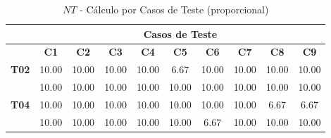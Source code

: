 \begin{table}[htbp]
	\centering
	\caption{$NT$ - Cálculo por Casos de Teste (proporcional)}
	\begin{tabular}{c|ccccccccc|}
		\cline{2-10}
		\rowcolor[HTML]{D0CECE} 
		\cellcolor[HTML]{F2F2F2}\textbf{} & \multicolumn{9}{c|}{\cellcolor[HTML]{D0CECE}\textbf{Casos de Teste}} \\ \hline
		\rowcolor[HTML]{D9D9D9} 
		\multicolumn{1}{|c|}{\cellcolor[HTML]{D0CECE}\textbf{Participante}} & \multicolumn{1}{c|}{\cellcolor[HTML]{D9D9D9}\textbf{C1}} & \multicolumn{1}{c|}{\cellcolor[HTML]{D9D9D9}\textbf{C2}} & \multicolumn{1}{c|}{\cellcolor[HTML]{D9D9D9}\textbf{C3}} & \multicolumn{1}{c|}{\cellcolor[HTML]{D9D9D9}\textbf{C4}} & \multicolumn{1}{c|}{\cellcolor[HTML]{D9D9D9}\textbf{C5}} & \multicolumn{1}{c|}{\cellcolor[HTML]{D9D9D9}\textbf{C6}} & \multicolumn{1}{c|}{\cellcolor[HTML]{D9D9D9}\textbf{C7}} & \multicolumn{1}{c|}{\cellcolor[HTML]{D9D9D9}\textbf{C8}} & \textbf{C9} \\ \hline
		\multicolumn{1}{|c|}{\textbf{T02}} & \multicolumn{1}{c|}{10.00} & \multicolumn{1}{c|}{10.00} & \multicolumn{1}{c|}{10.00} & \multicolumn{1}{c|}{10.00} & \multicolumn{1}{c|}{6.67} & \multicolumn{1}{c|}{10.00} & \multicolumn{1}{c|}{10.00} & \multicolumn{1}{c|}{10.00} & 10.00 \\ \hline
		\rowcolor[HTML]{F2F2F2} 
		\multicolumn{1}{|c|}{\cellcolor[HTML]{F2F2F2}\textbf{T03}} & \multicolumn{1}{c|}{\cellcolor[HTML]{F2F2F2}10.00} & \multicolumn{1}{c|}{\cellcolor[HTML]{F2F2F2}10.00} & \multicolumn{1}{c|}{\cellcolor[HTML]{F2F2F2}10.00} & \multicolumn{1}{c|}{\cellcolor[HTML]{F2F2F2}10.00} & \multicolumn{1}{c|}{\cellcolor[HTML]{F2F2F2}10.00} & \multicolumn{1}{c|}{\cellcolor[HTML]{F2F2F2}10.00} & \multicolumn{1}{c|}{\cellcolor[HTML]{F2F2F2}10.00} & \multicolumn{1}{c|}{\cellcolor[HTML]{F2F2F2}10.00} & 10.00 \\ \hline
		\multicolumn{1}{|c|}{\textbf{T04}} & \multicolumn{1}{c|}{10.00} & \multicolumn{1}{c|}{10.00} & \multicolumn{1}{c|}{10.00} & \multicolumn{1}{c|}{10.00} & \multicolumn{1}{c|}{10.00} & \multicolumn{1}{c|}{10.00} & \multicolumn{1}{c|}{10.00} & \multicolumn{1}{c|}{6.67} & 6.67 \\ \hline
		\rowcolor[HTML]{F2F2F2} 
		\multicolumn{1}{|c|}{\cellcolor[HTML]{F2F2F2}\textbf{T05}} & \multicolumn{1}{c|}{\cellcolor[HTML]{F2F2F2}10.00} & \multicolumn{1}{c|}{\cellcolor[HTML]{F2F2F2}10.00} & \multicolumn{1}{c|}{\cellcolor[HTML]{F2F2F2}10.00} & \multicolumn{1}{c|}{\cellcolor[HTML]{F2F2F2}10.00} & \multicolumn{1}{c|}{\cellcolor[HTML]{F2F2F2}10.00} & \multicolumn{1}{c|}{\cellcolor[HTML]{F2F2F2}6.67} & \multicolumn{1}{c|}{\cellcolor[HTML]{F2F2F2}10.00} & \multicolumn{1}{c|}{\cellcolor[HTML]{F2F2F2}10.00} & 10.00 \\ \hline

\end{tabular}
\end{table}
